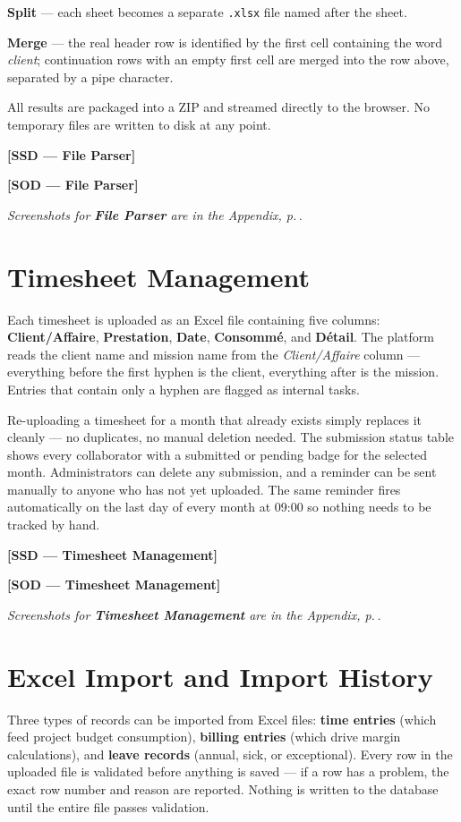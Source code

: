 \documentclass[12pt,a4paper]{report}
\newcommand{\ssd}[1]{\begin{placeholder}\textbf{[SSD --- #1]}\end{placeholder}\vspace{2pt}}
\newcommand{\sod}[1]{\begin{placeholder}\textbf{[SOD --- #1]}\end{placeholder}\vspace{4pt}}
\newcommand{\annexref}[1]{\begin{screenshotbox}\small\textit{Screenshots for \textbf{#1} are in the Appendix, p.\,\pageref{annex:#1}.}\end{screenshotbox}\vspace{4pt}}
\begin{document}
\textbf{Split} --- each sheet becomes a separate \texttt{.xlsx} file named after
the sheet.

\textbf{Merge} --- the real header row is identified by the first cell containing
the word \textit{client}; continuation rows with an empty first cell are merged
into the row above, separated by a pipe character.

All results are packaged into a ZIP and streamed directly to the browser. No
temporary files are written to disk at any point.

\ssd{File Parser}
\sod{File Parser}
\annexref{File Parser}

\section{Timesheet Management}

Each timesheet is uploaded as an Excel file containing five columns:
\textbf{Client/Affaire}, \textbf{Prestation}, \textbf{Date}, \textbf{Consommé},
and \textbf{Détail}. The platform reads the client name and mission name from
the \textit{Client/Affaire} column --- everything before the first hyphen is the
client, everything after is the mission. Entries that contain only a hyphen are
flagged as internal tasks.

Re-uploading a timesheet for a month that already exists simply replaces it cleanly
--- no duplicates, no manual deletion needed. The submission status table shows every
collaborator with a submitted or pending badge for the selected month. Administrators
can delete any submission, and a reminder can be sent manually to anyone who has not
yet uploaded. The same reminder fires automatically on the last day of every month
at 09:00 so nothing needs to be tracked by hand.

\ssd{Timesheet Management}
\sod{Timesheet Management}
\annexref{Timesheet Management}

\section{Excel Import and Import History}

Three types of records can be imported from Excel files: \textbf{time entries}
(which feed project budget consumption), \textbf{billing entries} (which drive
margin calculations), and \textbf{leave records} (annual, sick, or exceptional).
Every row in the uploaded file is validated before anything is saved --- if a row
has a problem, the exact row number and reason are reported. Nothing is written
to the database until the entire file passes validation.
\end{document}
